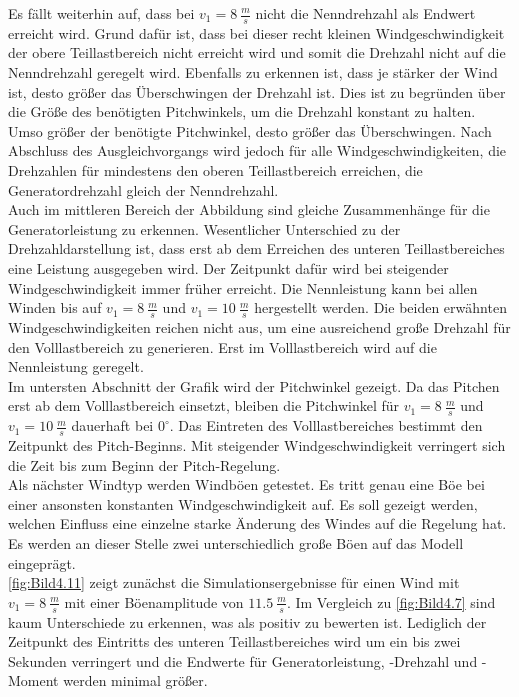 Es fällt weiterhin auf, dass bei $v_1 = \SI{8}{\frac{m}{s}}$ nicht die Nenndrehzahl als Endwert erreicht wird. Grund dafür ist, dass bei dieser recht kleinen Windgeschwindigkeit der obere Teillastbereich nicht erreicht wird und somit die Drehzahl nicht auf die Nenndrehzahl geregelt wird. Ebenfalls zu erkennen ist, dass je stärker der Wind ist, desto größer das Überschwingen der Drehzahl ist. Dies ist zu begründen über die Größe des benötigten Pitchwinkels, um die Drehzahl konstant zu halten. Umso größer der benötigte Pitchwinkel, desto größer das Überschwingen. Nach Abschluss des Ausgleichvorgangs wird jedoch für alle Windgeschwindigkeiten, die Drehzahlen für mindestens den oberen Teillastbereich erreichen, die Generatordrehzahl gleich der Nenndrehzahl.\\
Auch im mittleren Bereich der Abbildung sind gleiche Zusammenhänge für die Generatorleistung zu erkennen. Wesentlicher Unterschied zu der Drehzahldarstellung ist, dass erst ab dem Erreichen des unteren Teillastbereiches eine Leistung ausgegeben wird. Der Zeitpunkt dafür wird bei steigender Windgeschwindigkeit immer früher erreicht. Die Nennleistung kann bei allen Winden bis auf $v_1 = \SI{8}{\frac{m}{s}}$ und $v_1 = \SI{10}{\frac{m}{s}}$ hergestellt werden. Die beiden erwähnten Windgeschwindigkeiten reichen nicht aus, um eine ausreichend große Drehzahl für den Volllastbereich zu generieren. Erst im Volllastbereich wird auf die Nennleistung geregelt.\\
Im untersten Abschnitt der Grafik wird der Pitchwinkel gezeigt. Da das Pitchen erst ab dem Volllastbereich einsetzt, bleiben die Pitchwinkel für $v_1 = \SI{8}{\frac{m}{s}}$ und $v_1 = \SI{10}{\frac{m}{s}}$ dauerhaft bei $0^\circ$. Das Eintreten des Volllastbereiches bestimmt den Zeitpunkt des Pitch-Beginns. Mit steigender Windgeschwindigkeit verringert sich die Zeit bis zum Beginn der Pitch-Regelung.\\


Als nächster Windtyp werden Windböen getestet. Es tritt genau eine Böe bei einer ansonsten konstanten Windgeschwindigkeit auf. Es soll gezeigt werden, welchen Einfluss eine einzelne starke Änderung des Windes auf die Regelung hat. Es werden an dieser Stelle zwei unterschiedlich große Böen auf das Modell eingeprägt.\\
\autoref{fig:Bild4.11} zeigt zunächst die Simulationsergebnisse für einen Wind mit $v_1 = \SI{8}{\frac{m}{s}}$ mit einer Böenamplitude von \ca $\SI{11.5}{\frac{m}{s}}$. Im Vergleich zu \autoref{fig:Bild4.7} sind kaum Unterschiede zu erkennen, was als positiv zu bewerten ist. Lediglich der Zeitpunkt des Eintritts des unteren Teillastbereiches wird um ein bis zwei Sekunden verringert und die Endwerte für Generatorleistung, -Drehzahl und -Moment werden minimal größer.

